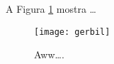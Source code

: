 \documentclass{article}
\begin{document}
 
A Figura \ref{fig:gerbil} mostra \ldots

\begin{figure}
\centering
\texttt{[image: gerbil]}
\caption{\label{fig:gerbil}Aww\ldots.}
\end{figure}
\end{document}
